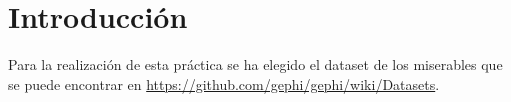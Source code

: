 \chapter{Introducción}

Para la realización de esta práctica se ha elegido el dataset de los miserables que se puede encontrar en \url{https://github.com/gephi/gephi/wiki/Datasets}.